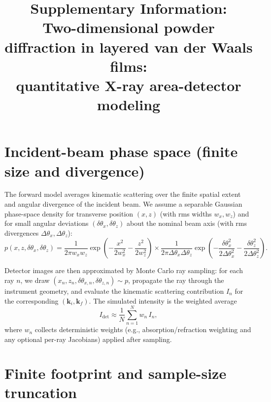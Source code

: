 \documentclass[12pt]{article}
\begin{document}
\title{Supplementary Information:\\
Two-dimensional powder diffraction in layered van der Waals films:\\
quantitative X-ray area-detector modeling}
\author{}
\date{}
\maketitle

\renewcommand{\thesection}{S\arabic{section}}
\renewcommand{\theequation}{S\arabic{equation}}

\section{Incident-beam phase space (finite size and divergence)}
\label{sec:si_beam_phase_space}

The forward model averages kinematic scattering over the finite spatial extent and angular divergence
of the incident beam. We assume a separable Gaussian phase-space density for transverse position
$(x,z)$ (with rms widths $w_x,w_z$) and for small angular deviations $(\delta\theta_x,\delta\theta_z)$
about the nominal beam axis (with rms divergences $\Delta\theta_x,\Delta\theta_z$):
\begin{equation}
  p(x,z,\delta\theta_x,\delta\theta_z)=
  \frac{1}{2\pi w_x w_z}\exp\!\left(-\frac{x^2}{2w_x^2}-\frac{z^2}{2w_z^2}\right)
  \times
  \frac{1}{2\pi \Delta\theta_x \Delta\theta_z}\exp\!\left(-\frac{\delta\theta_x^2}{2\Delta\theta_x^2}-\frac{\delta\theta_z^2}{2\Delta\theta_z^2}\right).
  \label{eq:si_beam_phase_space}
\end{equation}

Detector images are then approximated by Monte Carlo ray sampling: for each ray $n$, we draw
$(x_n,z_n,\delta\theta_{x,n},\delta\theta_{z,n})\sim p$, propagate the ray through the instrument
geometry, and evaluate the kinematic scattering contribution $I_n$ for the corresponding
$(\mathbf{k}_i,\mathbf{k}_f)$. The simulated intensity is the weighted average
\begin{equation}
  I_{\mathrm{det}}\approx \frac{1}{N}\sum_{n=1}^{N} w_n\,I_n,
  \label{eq:si_monte_carlo_average}
\end{equation}
where $w_n$ collects deterministic weights (e.g., absorption/refraction weighting and any optional
per-ray Jacobians) applied after sampling.

\section{Finite footprint and sample-size truncation}
\label{sec:si_footprint_truncation}
\end{document}
